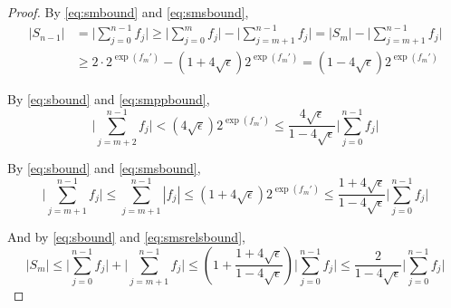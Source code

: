 \begin{proof}
      By  \eqref{eq:smbound} and \eqref{eq:smsbound},
      \begin{align}
        |S_{n-1}| & = \bigl|\sum\limits_{j = 0}^{n - 1} f_j\bigr| \geq \bigl|\sum\limits_{j = 0}^{m} f_j\bigr| - \bigl|\sum\limits_{j = m + 1}^{n - 1} f_j\bigr| = |S_m| - \bigl|\sum\limits_{j = m + 1}^{n - 1} f_j\bigr| \nonumber \\
        & \geq 2 \cdot 2^{\exp(f_{m}')} - \left(1 + 4 \sqrt\epsilon\right) 2^{\exp(f_m')} = \left(1 - 4 \sqrt\epsilon\right) 2^{\exp(f_m')}
        \label{eq:sbound}
      \end{align}

      By  \eqref{eq:sbound} and \eqref{eq:smppbound},
      \begin{equation}
        \bigl|\sum \limits_{j = m + 2}^{n - 1} f_j\bigr| < \left(4 \sqrt{\epsilon}\right) 2^{\exp(f_m')} \leq \frac{4 \sqrt\epsilon}{1 - 4  \sqrt\epsilon}\bigl|\sum\limits_{j = 0}^{n - 1}f_j\bigr|
        \label{eq:smpprelsbound}
      \end{equation}

      By  \eqref{eq:sbound} and \eqref{eq:smsbound},
      \begin{equation}
        \bigl|\sum\limits_{j = m + 1}^{n - 1}f_j\bigr| \leq \sum\limits_{j = m + 1}^{n - 1}|f_j| \leq \left(1 + 4  \sqrt\epsilon\right)2^{\exp(f_m')}\leq \frac{1 + 4  \sqrt\epsilon}{1 - 4  \sqrt\epsilon}\bigl|\sum\limits_{j = 0}^{n - 1}f_j\bigr|
        \label{eq:smsrelsbound}
      \end{equation}

      And by \eqref{eq:sbound} and \eqref{eq:smsrelsbound},
      \begin{equation}
        |S_m| \leq \bigl|\sum\limits_{j = 0}^{n - 1}f_j\bigr| + \bigl|\sum\limits_{j = m + 1}^{n - 1} f_j\bigr| \leq \left(1 + \frac{1 + 4  \sqrt\epsilon}{1 - 4  \sqrt\epsilon}\right)\bigl|\sum\limits_{j = 0}^{n - 1}f_j\bigr| \leq \frac{2}{1 - 4  \sqrt\epsilon}\bigl|\sum\limits_{j = 0}^{n - 1}f_j\bigr|
        \label{eq:smrelsbound}
      \end{equation}


\end{proof}
